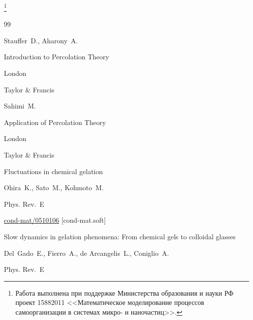 {\thanks{\noindent Работа выполнена при поддержке Министерства образования и науки РФ проект 15882011 <<Математическое моделирование процессов самоорганизации в системах микро- и наночастиц>>.}






\begin{thebibliography}{99}




\by Stauffer~D., Aharony~A.

\book Introduction to Percolation Theory

\publaddr London

\publ Taylor \& Francis






\by Sahimi~M.

\book Application of Percolation Theory

\publaddr London

\publ Taylor \& Francis






\paper Fluctuations in chemical gelation

\by Ohira~K., Sato~M., Kohmoto~M.

\jour Phys. Rev.~E






\arxiv \href{http://arxiv.org/abs/cond-mat/0510106}{cond-mat/0510106} [cond-mat.soft]





\paper Slow dynamics in gelation phenomena: From chemical gels to colloidal glasses

\by Del~Gado~E., Fierro~A., de Arcangelis~L., Coniglio~A.

\jour Phys. Rev.~E


\end{thebibliography}}
